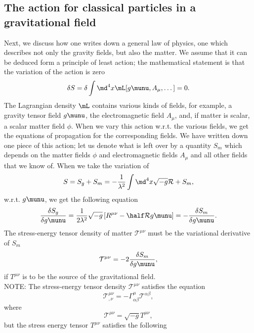 \subsection{The action for classical particles in a gravitational field}
Next, we discuss how one writes down a general law of physics, one which describes not only the gravity fields, but also the matter. We assume that it can be deduced form a principle of least action; the mathematical statement is that the variation of the action is zero
\begin{equation}
\delta S = \delta \int \md^4 x \mL[g\munu, A_\mu, \dots ] = 0.
\end{equation}
The Lagrangian density $\mL$ contains various kinds of fields, for example, a gravity tensor field $g\munu$, the electromagnetic field $A_\mu$, and, if matter is scalar, a scalar matter field $\phi$. When we vary this action w.r.t. the various fields, we get the equations of propagation for the corresponding fields. We have written down one piece of this action; let us denote what is left over by a quantity $S_m$ which depends on the matter fields $\phi$ and electromagnetic fields $A_\mu$ and all other fields that we know of. When we take the variation of
\begin{equation}
S= S_g+S_m = -\frac{1}{\lambda^2} \int \md^4 x \sqrt{-g} \mathcal{R} + S_m,
\end{equation}
w.r.t. $g\munu$, we get the following equation
\begin{equation}
\frac{\delta S_g}{\delta g\munu} = \frac{1}{2 \lambda^2} \sqrt{-g} \left[R^{\mu \nu } - \half \mathcal{R} g\munu \right] = - \frac{\delta S_m}{\delta g\munu}.
\end{equation}
The stress-energy tensor density of matter $\mathcal{T}^{\mu \nu}$ must be the variational derivative of $S_m$
\begin{equation}
\mathcal{T}^{\mu \nu} = - 2 \frac{\delta S_m}{\delta g\munu},
\end{equation}
if $T^{\mu \nu}$ is to be the source of the gravitational field.\\
NOTE: The stress-energy tensor density $\mathcal{T}^{\mu \nu}$ satisfies the equation
\begin{equation}
\mathcal{T}^{\mu \nu}_{,\nu} = - \Gamma^\mu_{\alpha \beta} \mathcal{T}^{\alpha \beta},
\end{equation}
where 
\begin{equation}
\mathcal{T}^{\mu \nu} = \sqrt{-g} T^{\mu \nu},
\end{equation}
but the stress energy tensor $T^{\mu \nu}$ satisfies the following
